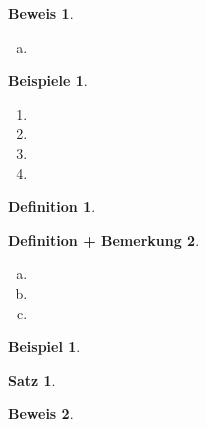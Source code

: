 \documentclass[a4paper, 12pt, numbers=noendperiod, chapterprefix=true]{scrbook}
\theoremstyle{break}
\newtheorem{Satz}{Satz}
\newtheorem{Def}{Definition}[section]
\newtheorem{DefBem}[Def]{Definition + Bemerkung}
\theoremstyle{nonumberbreak}
\newtheorem{bsp}{Beispiel}
\newtheorem{bspe}{Beispiele}
\newtheorem{bew}{Beweis}
\theoremstyle{nonumberplain}
\begin{document}
\begin{bew}\begin{enumerate}[a)]\item[c)]

\end{enumerate}\end{bew}

\begin{bspe}\begin{enumerate}[1)]
\item
	

\item
	

\item
	

\item
	
\end{enumerate}\end{bspe}

\begin{Def}

\end{Def}

\begin{DefBem}
\begin{enumerate}[a)]
\item
	
\item
	
\item
	
\end{enumerate}\end{DefBem}

\begin{bsp}

\end{bsp}

\begin{Satz}

\end{Satz}

\begin{bew}

\end{bew}




\appendix

\def\indexspace{\par\medskip}
\end{document}
